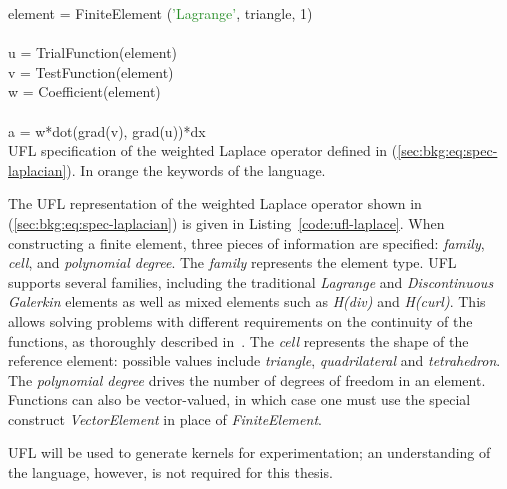 \begin{algorithm}
\scriptsize\ttfamily
{}

element = \textcolor{RedOrange}{FiniteElement} (\textcolor{ForestGreen}{'Lagrange'}, \textcolor{RedOrange}{triangle}, 1)\\
~\\
u = \textcolor{RedOrange}{TrialFunction}(element)\\
v = \textcolor{RedOrange}{TestFunction}(element)\\
w = \textcolor{RedOrange}{Coefficient}(element)\\
~\\
a = w*\textcolor{RedOrange}{dot}(\textcolor{RedOrange}{grad}(v), \textcolor{RedOrange}{grad}(u))*\textcolor{RedOrange}{dx}\\

\caption{UFL specification of the weighted Laplace operator defined in (\ref{sec:bkg:eq:spec-laplacian}). In orange the keywords of the language. }
\label{code:ufl-laplace}
\end{algorithm}

The UFL representation of the weighted Laplace operator shown in (\ref{sec:bkg:eq:spec-laplacian}) is given in Listing~\ref{code:ufl-laplace}. When constructing a finite element, three pieces of information are specified: {\em family}, {\em cell}, and {\em polynomial degree}. The {\em family} represents the element type. UFL supports several families, including the traditional {\em Lagrange} and {\em Discontinuous Galerkin} elements as well as mixed elements such as {\em H(div)} and {\em H(curl)}. This allows solving problems with different requirements on the continuity of the functions, as thoroughly described in~\cite{Fenics}. The {\em cell} represents the shape of the reference element: possible values include {\em triangle}, {\em quadrilateral} and {\em tetrahedron}. The {\em polynomial degree} drives the number of degrees of freedom in an element. Functions can also be vector-valued, in which case one must use the special construct {\em VectorElement} in place of {\em FiniteElement}. 

UFL will be used to generate kernels for experimentation; an understanding of the language, however, is not required for this thesis.


